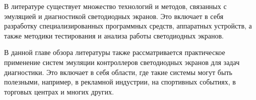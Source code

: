 В литературе существует множество технологий и методов, связанных с эмуляцией и диагностикой светодиодных экранов. Это включает в себя разработку специализированных программных средств, аппаратных устройств, а также методики тестирования и анализа работы светодиодных экранов.


В данной главе обзора литературы также рассматривается практическое применение систем эмуляции контроллеров светодиодных экранов для задач диагностики. Это включает в себя области, где такие системы могут быть полезными, например, в рекламной индустрии, на спортивных событиях, в торговых центрах и многих других.
